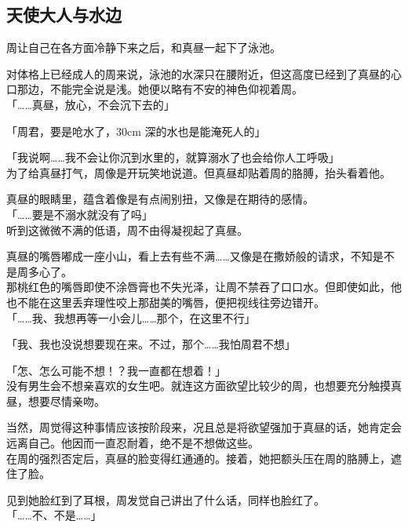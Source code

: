 \subsection{天使大人与水边}

周让自己在各方面冷静下来之后，和真昼一起下了泳池。

对体格上已经成人的周来说，泳池的水深只在腰附近，但这高度已经到了真昼的心口那边，不能完全说是浅。她便以略有不安的神色仰视着周。\\

「……真昼，放心，不会沉下去的」

「周君，要是呛水了，30cm 深的水也是能淹死人的」

「我说啊……我不会让你沉到水里的，就算溺水了也会给你人工呼吸」\\

为了给真昼打气，周像是开玩笑地说道。但真昼却贴着周的胳膊，抬头看着他。

真昼的眼睛里，蕴含着像是有点闹别扭，又像是在期待的感情。\\

「……要是不溺水就没有了吗」\\

听到这微微不满的低语，周不由得凝视起了真昼。

真昼的嘴唇嘟成一座小山，看上去有些不满……又像是在撒娇般的请求，不知是不是周多心了。\\

那桃红色的嘴唇即使不涂唇膏也不失光泽，让周不禁吞了口口水。但即使如此，他也不能在这里丢弃理性咬上那甜美的嘴唇，便把视线往旁边错开。\\

「……我、我想再等一小会儿……那个，在这里不行」

「我、我也没说想要现在来。不过，那个……我怕周君不想」

「怎、怎么可能不想！？我一直都在想着！」\\

没有男生会不想亲喜欢的女生吧。就连这方面欲望比较少的周，也想要充分触摸真昼，想要尽情亲吻。

当然，周觉得这种事情应该按阶段来，况且总是将欲望强加于真昼的话，她肯定会远离自己。他因而一直忍耐着，绝不是不想做这些。\\

在周的强烈否定后，真昼的脸变得红通通的。接着，她把额头压在周的胳膊上，遮住了脸。

见到她脸红到了耳根，周发觉自己讲出了什么话，同样也脸红了。\\

「……不、不是……」

